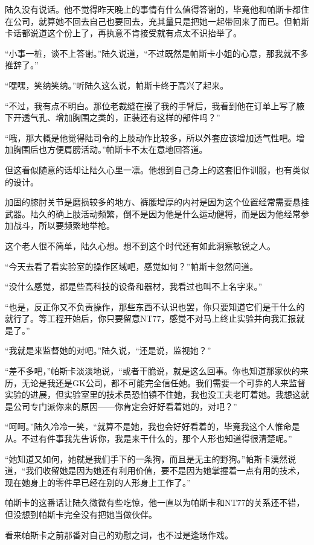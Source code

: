 陆久没有说话。他不觉得昨天晚上的事情有什么值得答谢的，毕竟他和帕斯卡都住在公司，就算她不回去自己也要回去，充其量只是把她一起带回来了而已。但帕斯卡话都说道这个份上了，再执意不肯接受就有点太不识抬举了。

“小事一桩，谈不上答谢。”陆久说道，“不过既然是帕斯卡小姐的心意，那我就不多推辞了。”

“嘿嘿，笑纳笑纳。”听陆久这么说，帕斯卡终于高兴了起来。

“不过，我有点不明白。那位老裁缝在摸了我的手臂后，我看到他在订单上写了腋下开透气孔、增加胸围之类的，正装还有这样的部件吗？”

“哦，那大概是他觉得陆司令的上肢动作比较多，所以外套应该增加透气性吧。增加胸围后也方便肩膀活动。”帕斯卡不太在意地回答道。

但这看似随意的话却让陆久心里一凛。他想到自己身上的这套旧作训服，也有类似的设计。

加固的膝肘关节是磨损较多的地方、裤腰增厚的内衬是因为这个位置经常需要悬挂武器。陆久的确上肢活动频繁，倒不是因为他是什么运动健将，而是因为他经常参加战斗，所以要频繁地举枪。

这个老人很不简单，陆久心想。想不到这个时代还有如此洞察敏锐之人。

“今天去看了看实验室的操作区域吧，感觉如何？”帕斯卡忽然问道。

“没什么感觉，都是些高科技的设备和器材，我看过也叫不上名字来。”

“也是，反正你又不负责操作，那些东西不认识也罢，你只要知道它们是干什么的就行了。等工程开始后，你只要留意NT77，感觉不对马上终止实验并向我汇报就是了。”

“我就是来监督她的对吧。”陆久说，“还是说，监视她？”

“差不多吧，”帕斯卡淡淡地说，“或者干脆说，就是这么回事。你也知道那家伙的来历，无论是我还是GK公司，都不可能完全信任她。我们需要一个可靠的人来监督实验的进展，但实验室里的技术员恐怕镇不住她，我也没工夫老盯着她。我想这就是公司专门派你来的原因——你肯定会好好看着她的，对吧？”

“呵呵。”陆久冷冷一笑，“就算不是她，我也会好好看着的，毕竟我这个人惟命是从。不过有件事我先告诉你，我是来干什么的，那个人形也知道得很清楚呢。”

“她知道又如何，她就是我们手下的一条狗，而且是无主的野狗。”帕斯卡漠然说道，“我们收留她是因为她还有利用价值，要不是因为她掌握着一点有用的技术，现在她身上的零件早已经在别的人形身上工作了。”

帕斯卡的这番话让陆久微微有些吃惊，他一直以为帕斯卡和NT77的关系还不错，但没想到帕斯卡完全没有把她当做伙伴。

看来帕斯卡之前那番对自己的劝慰之词，也不过是逢场作戏。

